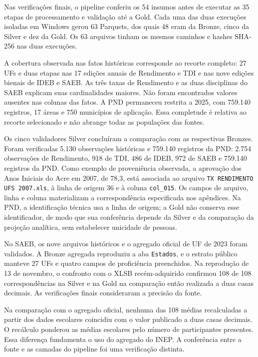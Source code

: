 Nas verificações finais, o pipeline conferiu os 54 insumos antes de executar as 35 etapas de processamento e validação até a Gold. Cada uma das duas execuções isoladas em Windows gerou 63 Parquets, dos quais 48 eram da Bronze, cinco da Silver e dez da Gold. Os 63 arquivos tinham os mesmos caminhos e hashes SHA-256 nas duas execuções.

A cobertura observada nas fatos históricas corresponde ao recorte completo: 27 UFs e duas etapas nas 17 edições anuais de Rendimento e TDI e nas nove edições bienais de IDEB e SAEB. As três taxas de Rendimento e as duas disciplinas do SAEB explicam suas cardinalidades maiores. Não foram encontrados valores ausentes nas colunas das fatos. A PND permaneceu restrita a 2025, com 759.140 registros, 17 áreas e 750 municípios de aplicação. Essa completude é relativa ao recorte selecionado e não abrange todas as populações das fontes.

Os cinco validadores Silver concluíram a comparação com as respectivas Bronzes. Foram verificadas 5.130 observações históricas e 759.140 registros da PND: 2.754 observações de Rendimento, 918 de TDI, 486 de IDEB, 972 de SAEB e 759.140 registros da PND. Como exemplo de proveniência observada, a aprovação dos Anos Iniciais do Acre em 2007, de 78,3, está associada ao arquivo \texttt{TX RENDIMENTO UFS 2007.xls}, à linha de origem 36 e à coluna \texttt{col\_015}. Os campos de arquivo, linha e coluna materializam a correspondência especificada nos apêndices. Na PND, a identificação técnica usa a linha de origem; a Gold não conserva esse identificador, de modo que sua conferência depende da Silver e da comparação da projeção analítica, sem estabelecer unicidade de pessoas.

No SAEB, os nove arquivos históricos e o agregado oficial de UF de 2023 foram validados. A Bronze agregada reproduziu a aba \texttt{Estados}, e o estrato público manteve 27 UFs e quatro campos de proficiência preenchidos. Na reprodução de 13 de novembro, o confronto com o XLSB recém-adquirido confirmou 108 de 108 correspondências na Silver e na Gold na comparação então realizada a duas casas decimais. As verificações finais consideraram a precisão da fonte.

Na comparação com o agregado oficial, nenhuma das 108 médias recalculadas a partir dos dados escolares coincidiu com o valor publicado a duas casas decimais. O recálculo ponderou as médias escolares pelo número de participantes presentes. Essa diferença fundamenta o uso do agregado do INEP. A conferência entre a fonte e as camadas do pipeline foi uma verificação distinta.

